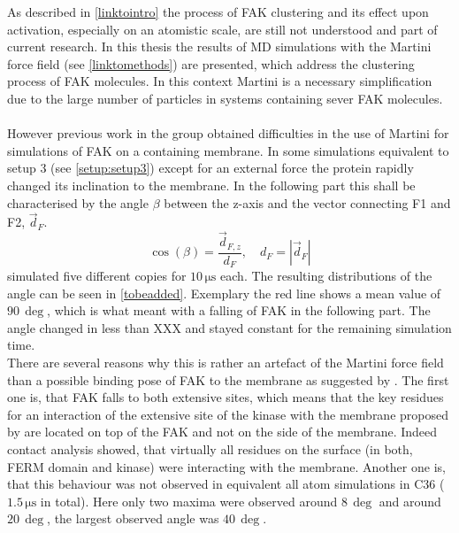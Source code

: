 \label{motivation}
As described in \autoref{linktointro} the process of FAK clustering and its effect upon activation, especially on an atomistic scale, are still not understood and part of current research. In this thesis the results of MD simulations with the Martini force field (see \autoref{linktomethods}) are presented, which address the clustering process of FAK molecules. In this context Martini is a necessary simplification due to the large number of particles in systems containing sever FAK molecules.\\
\\
However previous work in the group \autocite{sara} obtained difficulties in the use of Martini for simulations of FAK on a \pip{} containing membrane. In some simulations equivalent to setup 3 (see \autoref{setup:setup3}) except for an external force the protein rapidly changed its inclination to the membrane. In the following part this shall be characterised by the angle $\beta$ between the z-axis and the vector connecting F1 and F2, $\vec{d}_F$.
\begin{equation}
\cos\left(\beta\right) = \frac{\vec{d}_{F, z}}{d_F},\quad d_F = \left|\vec{d}_F\right|
\end{equation}
\textcite{sara} simulated five different copies for $10\,\si{\micro\second}$ each. The resulting distributions of the angle can be seen in \autoref{tobeadded}. Exemplary the red line shows a mean value of $90\,\si{\deg}$, which is what meant with a falling of FAK in the following part. The angle changed in less than XXX and stayed constant for the remaining simulation time.\\
There are several reasons why this is rather an artefact of the Martini force field than a possible binding pose of FAK to the membrane as suggested by \textcite{pap002}. The first one is, that FAK falls to both extensive sites, which means that the key residues for an interaction of the extensive site of the kinase with the membrane proposed by \textcite{pap002} are located on top of the FAK and not on the side of the membrane. Indeed contact analysis showed, that virtually all residues on the surface (in both, FERM domain and kinase) were interacting with the membrane. Another one is, that this behaviour was not observed in equivalent all atom simulations in C36 ($1.5\,\si{\micro\second}$ in total). Here only two maxima were observed around $8\,\si{\deg}$ and around $20\,\si{\deg}$, the largest observed angle was $40\,\si{\deg}$.\\
\\
